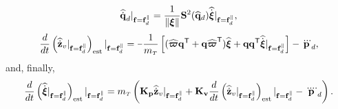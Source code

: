 \documentclass[journal,onecolumn]{IEEEtran}
\newcommand{\minus}{\scalebox{0.75}[1.0]{$-$}}
\begin{document}
	\begin{equation}
		\qddothat|_{\f=\f_d^{\|}} = \frac{1}{\|\Xiq\|}\Skew[2]{\qdhat}\widehat{\dot{\Xiq}}|_{\f=\f_d^{\|}},
		\label{eq:qd_dot_fd}
	\end{equation}
	\begin{equation}
		\frac{d}{dt}\LP\zvdothatdot|_{\f=\fd^{\|}}\RP_{\text{est}}|_{\f=\fd^{\|}} =  \minus\frac{1}{\mT}\LSB(\widehat{\bs{\varpi}}\dir[T] + \dir\widehat{\bs{\varpi}}\trs)\widehat{\Xiq} + \dir\dir[T]\widehat{\dot{\Xiq}}|_{\f=\fd^{\|}}\RSB - \pLdtdot,
	\end{equation}
	and, finally,
	\begin{equation}
		\frac{d}{dt}\LP\widehat{\dot{\Xiq}}|_{\f=\fd^{\|}}\RP_{\text{est}}|_{\f=\fd^{\|}} = \mT\left( {\bf K_p} \zvdothat|_{\f=\fd^{\|}}
		+  {\bf K_v} \frac{d}{dt}\LP\zvdothatdot|_{\f=\fd^{\|}}\RP_{\text{est}}|_{\f=\f_d^{\|}}
		- \pLdqdot\right).
	\end{equation}
	
\end{document}
